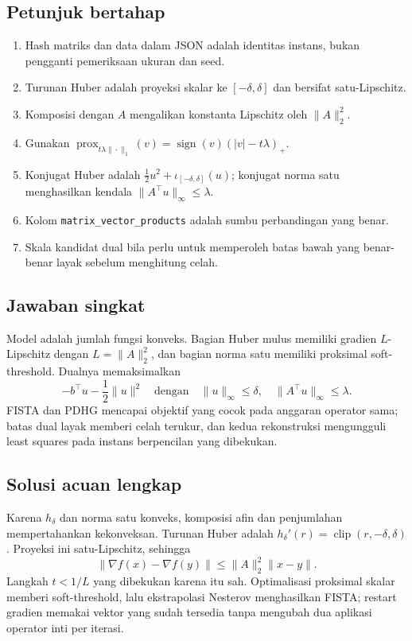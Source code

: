 \subsection*{Petunjuk bertahap}
\label{orig03:capstone:hint:0001}
\begin{enumerate}
  \item Hash matriks dan data dalam JSON adalah identitas instans, bukan
    pengganti pemeriksaan ukuran dan seed.
  \item Turunan Huber adalah proyeksi skalar ke $[-\delta,\delta]$ dan
    bersifat satu-Lipschitz.
  \item Komposisi dengan $A$ mengalikan konstanta Lipschitz oleh
    $\|A\|_2^2$.
  \item Gunakan
    $\operatorname{prox}_{t\lambda\|\cdot\|_1}(v)
     =\operatorname{sign}(v)(|v|-t\lambda)_+$.
  \item Konjugat Huber adalah $\frac12u^2+\iota_{[-\delta,\delta]}(u)$;
    konjugat norma satu menghasilkan kendala
    $\|A^\top u\|_\infty\leq\lambda$.
  \item Kolom \texttt{matrix\_vector\_products} adalah sumbu perbandingan
    yang benar.
  \item Skala kandidat dual bila perlu untuk memperoleh batas bawah yang
    benar-benar layak sebelum menghitung celah.
\end{enumerate}

\subsection*{Jawaban singkat}
\label{orig03:capstone:answer:0001}
Model adalah jumlah fungsi konveks. Bagian Huber mulus memiliki gradien
$L$-Lipschitz dengan $L=\|A\|_2^2$, dan bagian norma satu memiliki proksimal
soft-threshold. Dualnya memaksimalkan
\[
 -b^\top u-\frac12\|u\|^2
 \quad\text{dengan}\quad
 \|u\|_\infty\leq\delta,
 \quad \|A^\top u\|_\infty\leq\lambda.
\]
FISTA dan PDHG mencapai objektif yang cocok pada anggaran operator sama;
batas dual layak memberi celah terukur, dan kedua rekonstruksi mengungguli
least squares pada instans berpencilan yang dibekukan.

\subsection*{Solusi acuan lengkap}
\label{orig03:capstone:solution:0001}
Karena $h_\delta$ dan norma satu konveks, komposisi afin dan penjumlahan
mempertahankan kekonveksan. Turunan Huber adalah
$h_\delta'(r)=\operatorname{clip}(r,-\delta,\delta)$. Proyeksi ini
satu-Lipschitz, sehingga
\[
 \|\nabla f(x)-\nabla f(y)\|
 \leq\|A\|_2^2\|x-y\|.
\]
Langkah $t<1/L$ yang dibekukan karena itu sah. Optimalisasi proksimal skalar
memberi soft-threshold, lalu ekstrapolasi Nesterov menghasilkan FISTA; restart
gradien memakai vektor yang sudah tersedia tanpa mengubah dua aplikasi operator inti per
iterasi.

